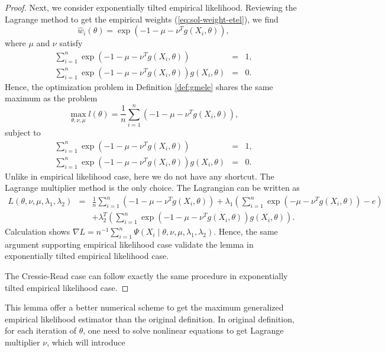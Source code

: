 \begin{proof}
Next, we consider exponentially tilted empirical likelihood. Reviewing
the Lagrange method to get the empirical weights (\ref{eq:sol-weight-etel}),
we find 
\[
\hat{w}_{i}\left(\theta\right)=\exp\left(-1-\mu-\nu^{T}g\left(X_{i},\theta\right)\right),
\]
where $\mu$ and $\nu$ satisfy 
\begin{eqnarray*}
\sum_{i=1}^{n}\exp\left(-1-\mu-\nu^{T}g\left(X_{i},\theta\right)\right) & = & 1,\\
\sum_{i=1}^{n}\exp\left(-1-\mu-\nu^{T}g\left(X_{i},\theta\right)\right)g\left(X_{i},\theta\right) & = & 0.
\end{eqnarray*}
 Hence, the optimization problem in Definition \ref{def:gmele} shares
the same maximum as the problem 
\[
\max_{\theta,\nu,\mu}l\left(\theta\right)=\frac{1}{n}\sum_{i=1}^{n}\left(-1-\mu-\nu^{T}g\left(X_{i},\theta\right)\right),
\]
subject to 
\begin{eqnarray*}
\sum_{i=1}^{n}\exp\left(-1-\mu-\nu^{T}g\left(X_{i},\theta\right)\right) & = & 1,\\
\sum_{i=1}^{n}\exp\left(-1-\mu-\nu^{T}g\left(X_{i},\theta\right)\right)g\left(X_{i},\theta\right) & = & 0.
\end{eqnarray*}
Unlike in empirical likelihood case, here we do not have any shortcut.
The Lagrange multiplier method is the only choice. The Lagrangian
can be written as 
\begin{eqnarray*}
L\left(\theta,\nu,\mu,\lambda_{1},\lambda_{2}\right) & = & \frac{1}{n}\sum_{i=1}^{n}\left(-1-\mu-\nu^{T}g\left(X_{i},\theta\right)\right)+\lambda_{1}\left(\sum_{i=1}^{n}\exp\left(-\mu-\nu^{T}g\left(X_{i},\theta\right)\right)-e\right)\\
 &  & +\lambda_{2}^{T}\left(\sum_{i=1}^{n}\exp\left(-1-\mu-\nu^{T}g\left(X_{i},\theta\right)\right)g\left(X_{i},\theta\right)\right).
\end{eqnarray*}
Calculation shows $\nabla L=n^{-1}\sum_{i=1}^{n}\Psi\left(X_{i}\mid\theta,\nu,\mu,\lambda_{1},\lambda_{2}\right)$.
Hence, the same argument supporting empirical likelihood case validate
the lemma in exponentially tilted empirical likelihood case.

The Cressie-Read case can follow exactly the same procedure in exponentially
tilted empirical likelihood case.
\end{proof}
This lemma offer a better numerical scheme to get the maximum generalized
empirical likelihood estimator than the original definition. In original
definition, for each iteration of $\theta$, one need to solve nonlinear
equations to get Lagrange multiplier $\nu$, which will introduce
